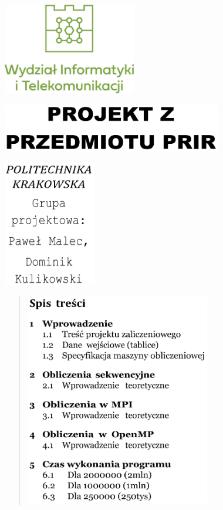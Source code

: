 \documentclass[
]{article}
\author{}
\date{}
\begin{document}
\includegraphics[width=2.29028in,height=1.57778in]{vertopal_45f5e71363bf454ba37a280ca069ec4b/media/image1.png}

\includegraphics[width=3.79167in,height=0.84722in]{vertopal_45f5e71363bf454ba37a280ca069ec4b/media/image2.png}

\includegraphics[width=1.59722in,height=2.16667in]{vertopal_45f5e71363bf454ba37a280ca069ec4b/media/image3.png}

\begin{quote}
\includegraphics[width=3.18056in,height=3.66667in]{vertopal_45f5e71363bf454ba37a280ca069ec4b/media/image4.png}
\end{quote}
\end{document}
